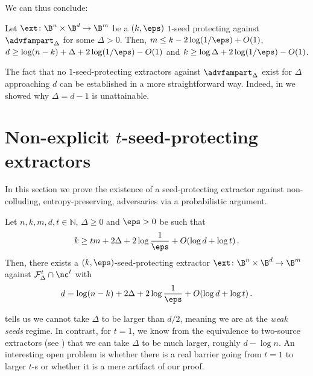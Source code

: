 We can thus conclude:
\begin{corollary}
Let $\ext \colon \B^{n} \times \B^{d} \rightarrow \B^{m}$ be a $(k,\eps)$ $1$-seed protecting against $\advfampart_{\Delta}$ for some $\Delta > 0$.
Then, 
$m \le k - 2\log(1/\eps)+O(1)$, $d \ge  \log(n-k)+\Delta+2\log(1/\eps)-O(1)$
and $k \ge \log\Delta+2\log(1/\eps)-O(1)$.
\end{corollary}

The fact that no $1$-seed-protecting extractors against $\advfampart_\Delta$
exist for $\Delta$ approaching $d$ can be established in a more straightforward
way. 
Indeed, in  we showed why
$\Delta = d-1$ is unattainable.


%
\section{Non-explicit 
\texorpdfstring{$t$-seed-protecting}{t-seed-protecting} extractors}\label{sec:nexp}

In this section we prove the existence of a seed-protecting extractor against non-colluding, entropy-preserving, adversaries via a probabilistic argument.

\begin{theorem}\label{thm:non-explicit}
Let $n,k,m,d,t \in \mathbb{N}$, $\Delta \ge 0$ and $\eps > 0$ be such that
\[
k \ge tm+2\Delta+2\log\frac{1}{\eps}+O(\log d + \log t)\,.
\]
Then, there exists a $(k,\eps)$-seed-protecting extractor $\ext \colon \B^{n} \times \B^{d} \rightarrow \B^{m}$ against
$\mathcal{F}_{\Delta}^{t} \cap \nc^t$ with
\[
d  = \log(n-k) + 2\Delta +2\log\frac{1}{\eps}+O(\log d + \log t)\,.
\]
\end{theorem}

%
\begin{remark}  %
 tells us we cannot take $\Delta$ to be larger than %
%
$d/2$, 
%
meaning
we are at the \emph{weak seeds} regime. In contrast, for $t = 1$, we know from the
equivalence to two-source extractors (see ) that we can take
$\Delta$ to be much larger, roughly $d-\log n$. An interesting open problem is 
whether there is a real barrier going from $t = 1$ to larger $t$-s or whether it is a mere
artifact of our proof.
\end{remark}   %

